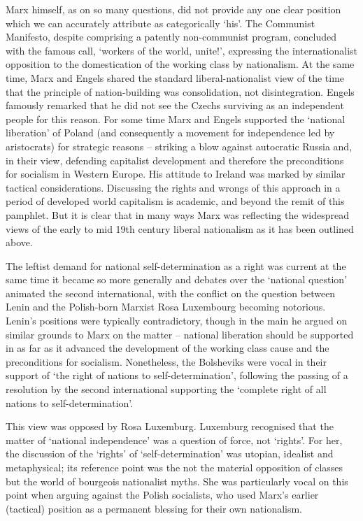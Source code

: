 Marx himself, as on so many questions, did not provide any one clear position which we can accurately attribute as categorically ‘his’.
The Communist Manifesto, despite comprising a patently non-communist program, concluded with the famous call, ‘workers of the world, unite!’, expressing the internationalist opposition to the domestication of the working class by nationalism.
At the same time, Marx and Engels shared the standard liberal-nationalist view of the time that the principle of nation-building was consolidation, not disintegration.
Engels famously remarked that he did not see the Czechs surviving as an independent people for this reason.
For some time Marx and Engels supported the ‘national liberation’ of Poland (and consequently a movement for independence led by aristocrats) for strategic reasons – striking a blow against autocratic Russia and, in their view, defending capitalist development and therefore the preconditions for socialism in Western Europe.
His attitude to Ireland was marked by similar tactical considerations.
Discussing the rights and wrongs of this approach in a period of developed world capitalism is academic, and beyond the remit of this pamphlet.
But it is clear that in many ways Marx was reflecting the widespread views of the early to mid 19th century liberal nationalism as it has been outlined above.

The leftist demand for national self-determination as a right was current at the same time it became so more generally and debates over the ‘national question’ animated the second international, with the conflict on the question between Lenin and the Polish-born Marxist Rosa Luxembourg becoming notorious.
Lenin’s positions were typically contradictory, though in the main he argued on similar grounds to Marx on the matter – national liberation should be supported in as far as it advanced the development of the working class cause and the preconditions for socialism.
Nonetheless, the Bolsheviks were vocal in their support of ‘the right of nations to self-determination’, following the passing of a resolution by the second international supporting the ‘complete right of all nations to self-determination’.

This view was opposed by Rosa Luxemburg.
Luxemburg recognised that the matter of ‘national independence’ was a question of force, not ‘rights’.
For her, the discussion of the ‘rights’ of ‘self-determination’ was utopian, idealist and metaphysical; its reference point was the not the material opposition of classes but the world of bourgeois nationalist myths.
She was particularly vocal on this point when arguing against the Polish socialists, who used Marx’s earlier (tactical) position as a permanent blessing for their own nationalism.

